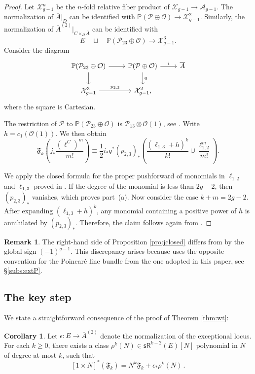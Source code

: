 \documentclass[11pt]{article}
\def\CO{\mathcal{O}}
\def\A{\mathcal{A}}
\def\P{\mathcal{P}}
\def\X{\mathcal{X}}
\def\PP{\mathbb{P}}
\def\sR{\mathsf{sR}}
\def\fm{\mathfrak{F}}
\newcommand{\barA}{\overline{A}}
\theoremstyle{definition}
\newtheorem{corollary}[definition]{Corollary}
\newtheorem{remark}[definition]{Remark}
\begin{document}
\begin{proof}
    Let $\X_{g-1}^n$ be the $n$-fold relative fiber product of $\X_{g-1} \to \A_{g-1}$. The normalization of $\barA|_{D}$ can be identified with $\PP(\P \oplus \CO) \longrightarrow \X_{g-1}^2$. Similarly, the normalization of $\barA^{(2)}|_{C \times_{D} \barA}$ can be identified with
    \[
    E \quad \sqcup \quad \PP(\P_{23} \oplus \CO) \longrightarrow \X_{g-1}^3.
    \]
    Consider the diagram
    \[
    \begin{tikzcd}
    \PP(\P_{23} \oplus \CO) \ar[r] \ar[d]
        & \PP(\P \oplus \CO) \ar[d,"q"] \ar[r,"i"]
        & \barA \\
    \X_{g-1}^3 \ar[r,"p_{2,3}"]
        & \X_{g-1}^2, &
    \end{tikzcd}
    \]
    where the square is Cartesian.

    The restriction of $\P$ to $\PP(\P_{23} \oplus \CO)$ is $\P_{13} \otimes \CO(1)$, see \cite[Theorem 5.1]{vdgK}. Write $h = c_1(\CO(1))$. We then obtain
    \[
    \fm_k \left(j_*\frac{(\ell^C)^m}{m!}\right) \equiv \frac{1}{2} i_* q^*(p_{2,3})_* \left(
    \frac{(\ell_{1,3} +h)^k}{k!} \cup \frac{\ell_{1,2}^m}{m!}
    \right).
    \]

    We apply the closed formula for the proper pushforward of monomials in $\ell_{1,2}$ and $\ell_{1,3}$ proved in \cite[Theorem~9.10]{BMP}. If the degree of the monomial is less than $2g-2$, then $(p_{2,3})_*$ vanishes, which proves part~(a).
    Now consider the case $k + m = 2g - 2$. After expanding $(\ell_{1,3} + h)^k$, any monomial containing a positive power of $h$ is annihilated by $(p_{2,3})_*$. Therefore, the claim follows again from \cite[Theorem~9.10]{BMP}.
\end{proof}

\begin{remark}
    The right-hand side of Proposition \ref{pro:jclosed} differs from \cite[eq. (114)]{BMP} by the global sign $(-1)^{g-1}$. This discrepancy arises because \cite{BMP} uses the opposite convention for the Poincar\'e line bundle from the one adopted in this paper, see \S \ref{subs:extP}.
\end{remark}

\subsection{The key step}

We state a straightforward consequence of the proof of Theorem \ref{thm:wt}:
\begin{corollary}\label{cor:Fwt}
    Let $\epsilon : E \to \barA^{(2)}$ denote the normalization of the exceptional locus.
    For each
    $k \geq 0$, there exists a class $\rho^{k}(N) \in \sR^{k-2}(E)[N]$ polynomial in $N$ of degree at most $k$, such that
    \[
    [1 \times N]^* (\fm_k) = N^k\fm_k + \epsilon_* \rho^k(N)\,.
    \]
\end{corollary}
\end{document}
